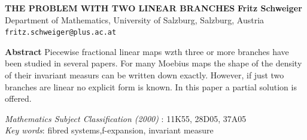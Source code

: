 \documentclass[12pt]{article}
\begin{document}
	\begin{center}
		\uppercase{\bf The problem with two linear branches}
		\vskip 20pt
		{\bf Fritz Schweiger}\\
		 Department of Mathematics, University of Salzburg, Salzburg, Austria\\
		{\tt fritz.schweiger@plus.ac.at}\\
	\end{center}
	
		\vskip 30pt
	{\bf Abstract}
	\noindent 
	Piecewise fractional linear maps wzth three or more branches have been studied in several papers. For many Moebius maps the shape of the density of their invariant measurs can be written down exactly. However, if just two branches are linear no explicit form is known. In this paper a partial solution is offered.
	
	
	\noindent
	{\em Mathematics Subject Classification (2000)} : 11K55, 28D05, 37A05\\
	{\em Key words}: fibred systems,f-expansion, invariant measure\\
	
\end{document}
